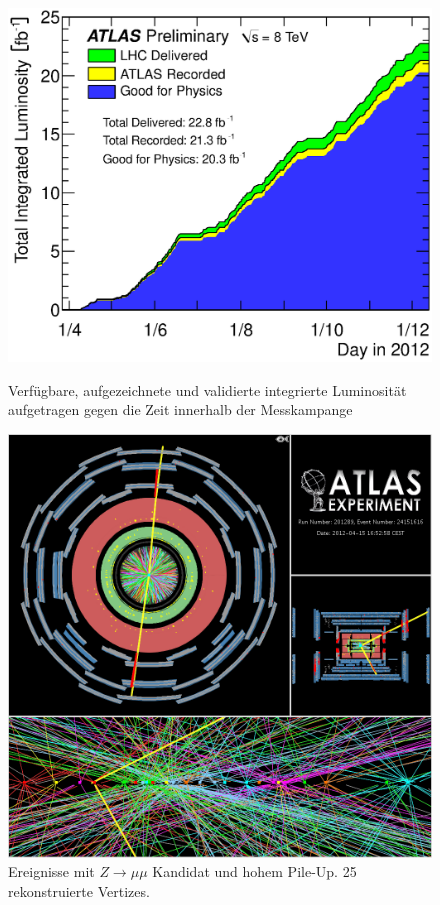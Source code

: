 \begin{figure}
    \begin{minipage}[b]{0.48\textwidth}
        \centering
        \includegraphics[width=1.\textwidth]{plots/lumi}
        \captionsetup{format=plain}
        \caption{Verfügbare, aufgezeichnete und validierte integrierte
            Luminosität aufgetragen gegen die Zeit innerhalb der Messkampange}
        \label{fig:lumi}
    \end{minipage}
    \hfill
    \begin{minipage}[b]{0.48\textwidth}
        \centering
        \includegraphics[width=1.\textwidth]{img/pileup}
        \captionsetup{format=plain}
        \caption{Ereignisse mit $Z \rightarrow \mu\mu$ Kandidat und hohem
            Pile-Up. 25 rekonstruierte Vertizes.}
        \label{fig:pileup}
    \end{minipage}
\end{figure}

